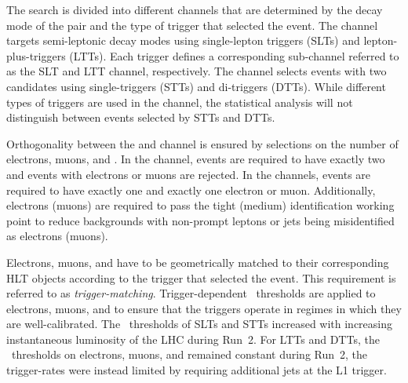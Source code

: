 The search is divided into different channels that are determined by the decay
mode of the \taulepton pair and the type of trigger that selected the event. The
\lephad channel targets semi-leptonic decay modes using single-lepton triggers
(SLTs) and lepton-plus-\tauhadvis triggers (LTTs). Each trigger defines a
corresponding sub-channel referred to as the \lephad SLT and \lephad LTT
channel, respectively. The \hadhad channel selects events with two \tauhadvis
candidates using single-\tauhadvis triggers (STTs) and di-\tauhadvis triggers
(DTTs). While different types of triggers are used in the \hadhad channel, the
statistical analysis will not distinguish between events selected by STTs and
DTTs.


Orthogonality between the \lephad and \hadhad channel is ensured by selections
on the number of electrons, muons, and \tauhadvis. In the \hadhad channel,
events are required to have exactly two \tauhadvis and events with electrons or
muons are rejected. In the \lephad channels, events are required to have exactly
one \tauhadvis and exactly one electron or muon. Additionally, electrons (muons)
are required to pass the tight (medium) identification working point to reduce
backgrounds with non-prompt leptons or jets being misidentified as electrons
(muons).

Electrons, muons, and \tauhadvis have to be geometrically matched to their
corresponding HLT objects according to the trigger that selected the event. This
requirement is referred to as \emph{trigger-matching}. Trigger-dependent
\pT~thresholds are applied to electrons, muons, and \tauhadvis to ensure that
the triggers operate in regimes in which they are well-calibrated. The
\pT~thresholds of SLTs and STTs increased with increasing instantaneous
luminosity of the LHC during Run~2. For LTTs and DTTs, the \pT~thresholds on
electrons, muons, and \tauhadvis remained constant during Run~2, the
trigger-rates were instead limited by requiring additional jets at the L1
trigger.


